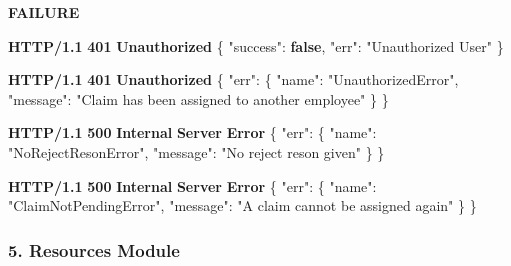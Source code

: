 \documentclass[
]{article}
\newenvironment{Shaded}{}{}
\newcommand{\DataTypeTok}[1]{\textcolor[rgb]{0.56,0.13,0.00}{#1}}
\newcommand{\ErrorTok}[1]{\textcolor[rgb]{1.00,0.00,0.00}{\textbf{#1}}}
\newcommand{\FunctionTok}[1]{\textcolor[rgb]{0.02,0.16,0.49}{#1}}
\newcommand{\KeywordTok}[1]{\textcolor[rgb]{0.00,0.44,0.13}{\textbf{#1}}}
\newcommand{\StringTok}[1]{\textcolor[rgb]{0.25,0.44,0.63}{#1}}
\begin{document}
\textbf{FAILURE}

\begin{Shaded}
\begin{Highlighting}[]
\ErrorTok{HTTP/1.1} \ErrorTok{401} \ErrorTok{Unauthorized}
\FunctionTok{\{}
    \DataTypeTok{"success"}\FunctionTok{:} \KeywordTok{false}\FunctionTok{,}
    \DataTypeTok{"err"}\FunctionTok{:} \StringTok{"Unauthorized User"}
\FunctionTok{\}}
\end{Highlighting}
\end{Shaded}

\begin{Shaded}
\begin{Highlighting}[]
\ErrorTok{HTTP/1.1} \ErrorTok{401} \ErrorTok{Unauthorized}
\FunctionTok{\{}
    \DataTypeTok{"err"}\FunctionTok{:} \FunctionTok{\{}
        \DataTypeTok{"name"}\FunctionTok{:} \StringTok{"UnauthorizedError"}\FunctionTok{,}
        \DataTypeTok{"message"}\FunctionTok{:} \StringTok{"Claim has been assigned to another employee"}
    \FunctionTok{\}}
\FunctionTok{\}}
\end{Highlighting}
\end{Shaded}

\begin{Shaded}
\begin{Highlighting}[]
\ErrorTok{HTTP/1.1} \ErrorTok{500} \ErrorTok{Internal} \ErrorTok{Server} \ErrorTok{Error}
\FunctionTok{\{}
    \DataTypeTok{"err"}\FunctionTok{:} \FunctionTok{\{}
        \DataTypeTok{"name"}\FunctionTok{:} \StringTok{"NoRejectResonError"}\FunctionTok{,}
        \DataTypeTok{"message"}\FunctionTok{:} \StringTok{"No reject reson given"}
    \FunctionTok{\}}
\FunctionTok{\}}
\end{Highlighting}
\end{Shaded}

\begin{Shaded}
\begin{Highlighting}[]
\ErrorTok{HTTP/1.1} \ErrorTok{500} \ErrorTok{Internal} \ErrorTok{Server} \ErrorTok{Error}
\FunctionTok{\{}
    \DataTypeTok{"err"}\FunctionTok{:} \FunctionTok{\{}
        \DataTypeTok{"name"}\FunctionTok{:} \StringTok{"ClaimNotPendingError"}\FunctionTok{,}
        \DataTypeTok{"message"}\FunctionTok{:} \StringTok{"A claim cannot be assigned again"}
    \FunctionTok{\}}
\FunctionTok{\}}
\end{Highlighting}
\end{Shaded}

\hypertarget{header-n1006}{%
\subsubsection{5. Resources Module}\label{header-n1006}}
\end{document}
